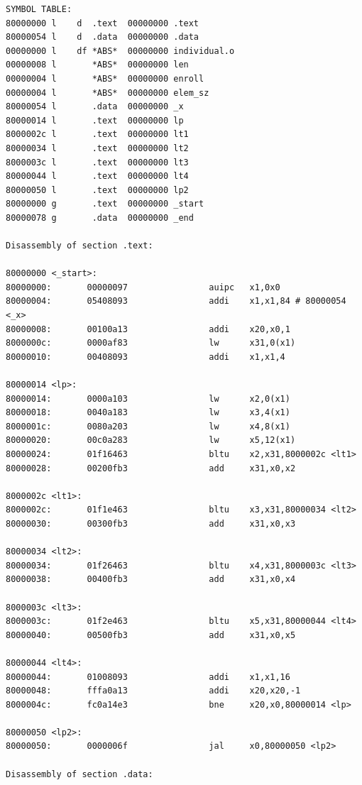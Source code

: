 \begin{lstlisting}[label={common_disasm}, language={RISC-V}, caption=Дизассеблированный код программы для варианта 21]
SYMBOL TABLE:
80000000 l    d  .text  00000000 .text
80000054 l    d  .data  00000000 .data
00000000 l    df *ABS*  00000000 individual.o
00000008 l       *ABS*  00000000 len
00000004 l       *ABS*  00000000 enroll
00000004 l       *ABS*  00000000 elem_sz
80000054 l       .data  00000000 _x
80000014 l       .text  00000000 lp
8000002c l       .text  00000000 lt1
80000034 l       .text  00000000 lt2
8000003c l       .text  00000000 lt3
80000044 l       .text  00000000 lt4
80000050 l       .text  00000000 lp2
80000000 g       .text  00000000 _start
80000078 g       .data  00000000 _end

Disassembly of section .text:

80000000 <_start>:
80000000:       00000097                auipc   x1,0x0
80000004:       05408093                addi    x1,x1,84 # 80000054 <_x>
80000008:       00100a13                addi    x20,x0,1
8000000c:       0000af83                lw      x31,0(x1)
80000010:       00408093                addi    x1,x1,4

80000014 <lp>:
80000014:       0000a103                lw      x2,0(x1)
80000018:       0040a183                lw      x3,4(x1)
8000001c:       0080a203                lw      x4,8(x1)
80000020:       00c0a283                lw      x5,12(x1)
80000024:       01f16463                bltu    x2,x31,8000002c <lt1>
80000028:       00200fb3                add     x31,x0,x2

8000002c <lt1>:
8000002c:       01f1e463                bltu    x3,x31,80000034 <lt2>
80000030:       00300fb3                add     x31,x0,x3

80000034 <lt2>:
80000034:       01f26463                bltu    x4,x31,8000003c <lt3>
80000038:       00400fb3                add     x31,x0,x4

8000003c <lt3>:
8000003c:       01f2e463                bltu    x5,x31,80000044 <lt4>
80000040:       00500fb3                add     x31,x0,x5

80000044 <lt4>:
80000044:       01008093                addi    x1,x1,16
80000048:       fffa0a13                addi    x20,x20,-1
8000004c:       fc0a14e3                bne     x20,x0,80000014 <lp>

80000050 <lp2>:
80000050:       0000006f                jal     x0,80000050 <lp2>

Disassembly of section .data:


\end{lstlisting}
